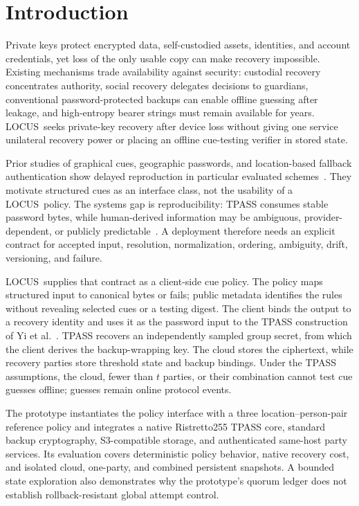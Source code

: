 \documentclass[sigconf,anonymous]{acmart}
\newcounter{protocol}
\newcommand{\LOCUS}{\textsf{LOCUS}}
\begin{document}
\section{Introduction}
\label{sec:introduction}

Private keys protect encrypted data, self-custodied assets, identities, and account credentials, yet loss of the only usable copy can make recovery impossible. Existing mechanisms trade availability against security: custodial recovery concentrates authority, social recovery delegates decisions to guardians, conventional password-protected backups can enable offline guessing after leakage, and high-entropy bearer strings must remain available for years. \LOCUS\ seeks private-key recovery after device loss without giving one service unilateral recovery power or placing an offline cue-testing verifier in stored state.

Prior studies of graphical cues, geographic passwords, and location-based fallback authentication show delayed reproduction in particular evaluated schemes~\cite{AlAmeen2015Cues,AlAmeen2017GeoPass,Hang2015LocationFallback,Zhou2025MapPasswords}. They motivate structured cues as an interface class, not the usability of a \LOCUS\ policy. The systems gap is reproducibility: TPASS consumes stable password bytes, while human-derived information may be ambiguous, provider-dependent, or publicly predictable~\cite{Bonneau2015Secrets,Yan2004Password}. A deployment therefore needs an explicit contract for accepted input, resolution, normalization, ordering, ambiguity, drift, versioning, and failure.

\LOCUS\ supplies that contract as a client-side cue policy. The policy maps structured input to canonical bytes or fails; public metadata identifies the rules without revealing selected cues or a testing digest. The client binds the output to a recovery identity and uses it as the password input to the TPASS construction of Yi et al.~\cite{Yi2015TPASS,Yi2019TPASS}. TPASS recovers an independently sampled group secret, from which the client derives the backup-wrapping key. The cloud stores the ciphertext, while recovery parties store threshold state and backup bindings. Under the TPASS assumptions, the cloud, fewer than \(t\) parties, or their combination cannot test cue guesses offline; guesses remain online protocol events.

The prototype instantiates the policy interface with a three location--person-pair reference policy and integrates a native Ristretto255 TPASS core, standard backup cryptography, S3-compatible storage, and authenticated same-host party services. Its evaluation covers deterministic policy behavior, native recovery cost, and isolated cloud, one-party, and combined persistent snapshots. A bounded state exploration also demonstrates why the prototype's quorum ledger does not establish rollback-resistant global attempt control.
\end{document}
